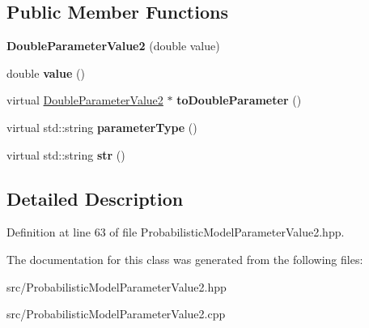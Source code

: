 \subsection*{Public Member Functions}
\begin{DoxyCompactItemize}
\item 
\mbox{\label{classtops_1_1DoubleParameterValue2_a2d122a816e7b3c6a7470c74e23c890ed}} 
{\bfseries Double\+Parameter\+Value2} (double value)
\item 
\mbox{\label{classtops_1_1DoubleParameterValue2_a6a66def34e4b40277da406f372216e6d}} 
double {\bfseries value} ()
\item 
\mbox{\label{classtops_1_1DoubleParameterValue2_a692fbfb2e4b4f809cad4bec4822ad41a}} 
virtual \hyperlink{classtops_1_1DoubleParameterValue2}{Double\+Parameter\+Value2} $\ast$ {\bfseries to\+Double\+Parameter} ()
\item 
\mbox{\label{classtops_1_1DoubleParameterValue2_a98cc3cefaac126f16626083a3e586c12}} 
virtual std\+::string {\bfseries parameter\+Type} ()
\item 
\mbox{\label{classtops_1_1DoubleParameterValue2_a803b1dc9aefe6a1abe451ad06017cfe3}} 
virtual std\+::string {\bfseries str} ()
\end{DoxyCompactItemize}


\subsection{Detailed Description}


Definition at line 63 of file Probabilistic\+Model\+Parameter\+Value2.\+hpp.



The documentation for this class was generated from the following files\+:\begin{DoxyCompactItemize}
\item 
src/Probabilistic\+Model\+Parameter\+Value2.\+hpp\item 
src/Probabilistic\+Model\+Parameter\+Value2.\+cpp\end{DoxyCompactItemize}
